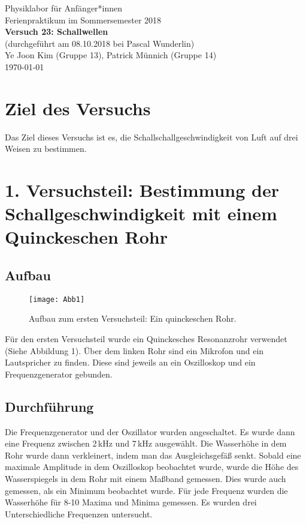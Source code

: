 \documentclass[11pt,a4paper]{article}
\newcommand{\halftime}[4]{\begin{figure}[h]
\begin{minipage}{.#1\textwidth}#3\end{minipage}\begin{minipage}{.#2\textwidth}
\centering
#4\end{minipage}
\end{figure}}
\begin{document}
{
\centering 
\large 
Physiklabor für Anf\"anger*innen \\
Ferienpraktikum im Sommersemester 2018 \\[4mm]
\textbf{\LARGE 
Versuch 23: Schallwellen
} \\[3mm]
(durchgef\"uhrt am 08.10.2018 bei Pascal Wunderlin) \\
Ye Joon Kim (Gruppe 13), Patrick M\"unnich (Gruppe 14)\\
\today \\[10mm]
}

\vspace{50pt}
\tableofcontents
\vspace{22pt}
\listoftables
\vspace{22pt}
\listoffigures
\pagebreak

\section{Ziel des Versuchs}
Das Ziel dieses Versuchs ist es, die Schallschallgeschwindigkeit von Luft auf drei Weisen zu bestimmen. 

\section{1. Versuchsteil: Bestimmung der Schallgeschwindigkeit mit einem Quinckeschen Rohr}


\subsection{Aufbau}

\begin{figure}
	\centering
	\texttt{[image: Abb1]}
	\caption{Aufbau zum ersten Versuchsteil: Ein quinckeschen Rohr. \cite{Anleitung}}
\end{figure}
Für den ersten Versuchsteil wurde ein Quinckesches Resonanzrohr verwendet (Siehe Abbildung 1). \"Uber dem linken Rohr sind ein Mikrofon und ein Lautspricher zu finden. Diese sind jeweils an ein Oszilloskop und ein Frequenzgenerator gebunden.


\subsection{Durchführung}
Die Frequenzgenerator und der Oszillator wurden angeschaltet. Es wurde dann eine Frequenz zwischen 2\,kHz und 7\,kHz ausgewählt. Die Wasserhöhe in dem Rohr wurde dann verkleinert, indem man das Ausgleichsgefäß senkt. Sobald eine maximale Amplitude in dem Oszilloskop beobachtet wurde, wurde die Höhe des Wasserspiegels in dem Rohr mit einem Maßband gemessen. Dies wurde auch gemessen, als ein Minimum beobachtet wurde. Für jede Frequenz wurden die Wasserhöhe für 8-10 Maxima und Minima gemessen. Es wurden drei Unterschiedliche Frequenzen untersucht. 
\end{document}
